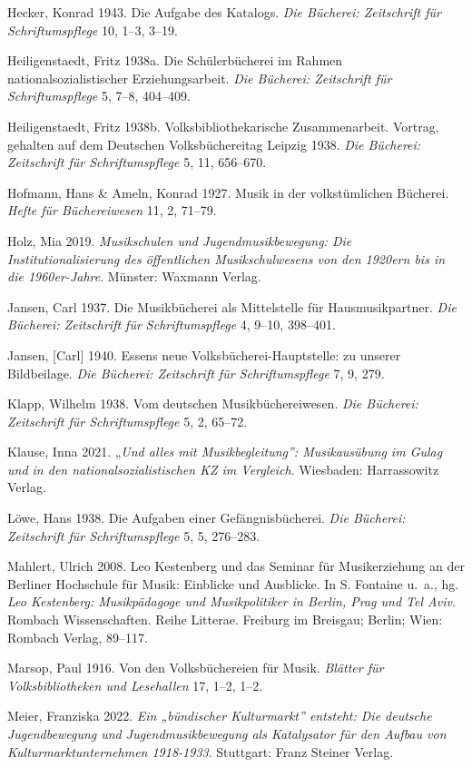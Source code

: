 \documentclass[a4paper,
fontsize=11pt,
oneside,
numbers=noperiodatend,
parskip=half-,
bibliography=totoc,
final
]{scrartcl}
\begin{document}
Hecker, Konrad 1943. Die Aufgabe des Katalogs. \emph{Die Bücherei:
Zeitschrift für Schriftumspflege} 10, 1--3, 3--19.

Heiligenstaedt, Fritz 1938a. Die Schülerbücherei im Rahmen
nationalsozialistischer Erziehungsarbeit. \emph{Die Bücherei:
Zeitschrift für Schriftumspflege} 5, 7--8, 404--409.

Heiligenstaedt, Fritz 1938b. Volksbibliothekarische Zusammenarbeit.
Vortrag, gehalten auf dem Deutschen Volksbüchereitag Leipzig 1938.
\emph{Die Bücherei: Zeitschrift für Schriftumspflege} 5, 11, 656--670.

Hofmann, Hans \& Ameln, Konrad 1927. Musik in der volkstümlichen
Bücherei. \emph{Hefte für Büchereiwesen} 11, 2, 71--79.

Holz, Mia 2019. \emph{Musikschulen und Jugendmusikbewegung: Die
Institutionalisierung des öffentlichen Musikschulwesens von den 1920ern
bis in die 1960er-Jahre}. Münster: Waxmann Verlag.

Jansen, Carl 1937. Die Musikbücherei als Mittelstelle für
Hausmusikpartner. \emph{Die Bücherei: Zeitschrift für Schriftumspflege}
4, 9--10, 398--401.

Jansen, {[}Carl{]} 1940. Essens neue Volksbücherei-Hauptstelle: zu
unserer Bildbeilage. \emph{Die Bücherei: Zeitschrift für
Schriftumspflege} 7, 9, 279.

Klapp, Wilhelm 1938. Vom deutschen Musikbüchereiwesen. \emph{Die
Bücherei: Zeitschrift für Schriftumspflege} 5, 2, 65--72.

Klause, Inna 2021. „\emph{Und alles mit Musikbegleitung'': Musikausübung
im Gulag und in den nationalsozialistischen KZ im Vergleich}. Wiesbaden:
Harrassowitz Verlag.

Löwe, Hans 1938. Die Aufgaben einer Gefängnisbücherei. \emph{Die
Bücherei: Zeitschrift für Schriftumspflege} 5, 5, 276--283.

Mahlert, Ulrich 2008. Leo Kestenberg und das Seminar für Musikerziehung
an der Berliner Hochschule für Musik: Einblicke und Ausblicke. In S.
Fontaine u.~a., hg. \emph{Leo Kestenberg: Musikpädagoge und
Musikpolitiker in Berlin, Prag und Tel Aviv}. Rombach Wissenschaften.
Reihe Litterae. Freiburg im Breisgau; Berlin; Wien: Rombach Verlag,
89--117.

Marsop, Paul 1916. Von den Volksbüchereien für Musik. \emph{Blätter für
Volksbibliotheken und Lesehallen} 17, 1--2, 1--2.

Meier, Franziska 2022. \emph{Ein „bündischer Kulturmarkt'' entsteht: Die
deutsche Jugendbewegung und Jugendmusikbewegung als Katalysator für den
Aufbau von Kulturmarktunternehmen 1918-1933}. Stuttgart: Franz Steiner
Verlag.
\end{document}
